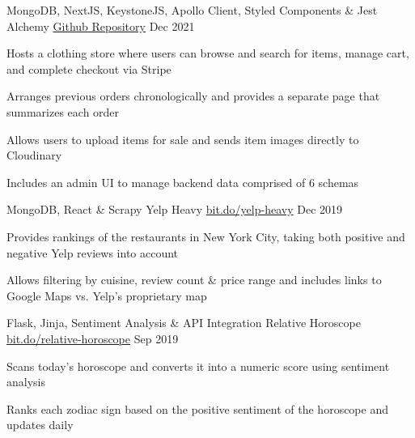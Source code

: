 

\begin{cventries}

  \cventry
  {MongoDB, NextJS, KeystoneJS, Apollo Client, Styled Components \& Jest} %
  {Alchemy} %
  {\href{https://github.com/ysmike/alchemy}{Github Repository}} %
  {Dec 2021} %
  {
    \begin{cvitems} %
      \item {Hosts a clothing store where users can browse and search for items, manage cart, and complete checkout via Stripe}
      \item {Arranges previous orders chronologically and provides a separate page that summarizes each order}
      \item {Allows users to upload items for sale and sends item images directly to Cloudinary}
      \item {Includes an admin UI to manage backend data comprised of 6 schemas}
    \end{cvitems}
  }

  \cventry
  {MongoDB, React \& Scrapy} %
  {Yelp Heavy} %
  {\href{https://yelp-heavy.herokuapp.com/}{bit.do/yelp-heavy}} %
  {Dec 2019} %
  {
    \begin{cvitems} %
      \item {Provides rankings of the restaurants in New York City, taking both positive and negative Yelp reviews into account}
      \item {Allows filtering by cuisine, review count \& price range and includes links to Google Maps vs. Yelp's proprietary map}
    \end{cvitems}
  }

  \cventry
  {Flask, Jinja, Sentiment Analysis \& API Integration} %
  {Relative Horoscope} %
  {\href{https://relative-horoscope.herokuapp.com/}{bit.do/relative-horoscope}} %
  {Sep 2019} %
  {
    \begin{cvitems} %
      \item {Scans today's horoscope and converts it into a numeric score using sentiment analysis}
      \item {Ranks each zodiac sign based on the positive sentiment of the horoscope and updates daily}
    \end{cvitems}
  }

\end{cventries}